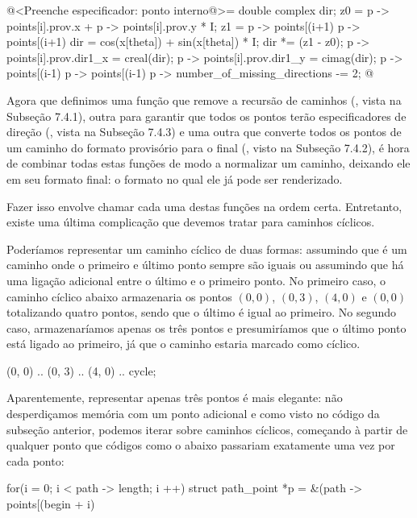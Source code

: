 \iniciocodigo
@<Preenche especificador: ponto interno@>=
{
  double complex dir;
  z0 = p -> points[i].prov.x + p -> points[i].prov.y * I;
  z1 = p -> points[(i+1) %
       p -> points[(i+1) %
  dir = cos(x[theta]) + sin(x[theta]) * I;
  dir *= (z1 - z0);
  p -> points[i].prov.dir1_x = creal(dir);
  p -> points[i].prov.dir1_y = cimag(dir);
  p -> points[(i-1) %
  p -> points[(i-1) %
  p -> number_of_missing_directions -= 2;
}
@
\fimcodigo


Agora que definimos uma função que remove a recursão de caminhos
(, vista na Subseção 7.4.1), outra
para garantir que todos os pontos terão especificadores de direção
(, vista na Subseção 7.4.3) e
uma outra que converte todos os pontos de um caminho do formato
provisório para o final (, visto na
Subseção 7.4.2), é hora de combinar todas estas funções de modo a
normalizar um caminho, deixando ele em seu formato final: o formato no
qual ele já pode ser renderizado.

Fazer isso envolve chamar cada uma destas funções na ordem
certa. Entretanto, existe uma última complicação que devemos tratar
para caminhos cíclicos.

Poderíamos representar um caminho cíclico de duas formas: assumindo
que é um caminho onde o primeiro e último ponto sempre são iguais ou
assumindo que há uma ligação adicional entre o último e o primeiro
ponto. No primeiro caso, o caminho cíclico abaixo armazenaria os
pontos $(0, 0)$, $(0, 3)$, $(4, 0)$ e $(0, 0)$ totalizando quatro
pontos, sendo que o último é igual ao primeiro. No segundo caso,
armazenaríamos apenas os três pontos e presumiríamos que o último
ponto está ligado ao primeiro, já que o caminho estaria marcado como
cíclico.

\alinhaverbatim
(0, 0) .. (0, 3) .. (4, 0) .. cycle;
\alinhanormal

Aparentemente, representar apenas três pontos é mais elegante: não
desperdiçamos memória com um ponto adicional e como visto no código da
subseção anterior, podemos iterar sobre caminhos cíclicos, começando à
partir de qualquer ponto que códigos como o abaixo passariam
exatamente uma vez por cada ponto:

\alinhaverbatim
for(i = 0; i < path -> length; i ++)
  struct path_point *p = &(path -> points[(begin + i) %
\alinhanormal

